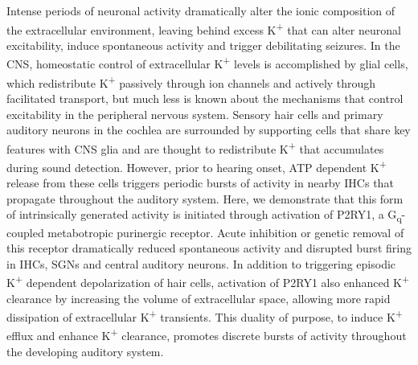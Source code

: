 \documentclass[9pt,lineno]{elife}
\begin{document}
Intense periods of neuronal activity dramatically alter the ionic composition of the extracellular environment, leaving behind excess K\textsuperscript{+} that can alter neuronal excitability, induce spontaneous activity and trigger debilitating seizures. In the CNS, homeostatic control of extracellular K\textsuperscript{+} levels is accomplished by glial cells, which redistribute K\textsuperscript{+} passively through ion channels and actively through facilitated transport, but much less is known about the mechanisms that control excitability in the peripheral nervous system. Sensory hair cells and primary auditory neurons in the cochlea are surrounded by supporting cells that share key features with CNS glia and are thought to redistribute K\textsuperscript{+} that accumulates during sound detection. However, prior to hearing onset, ATP dependent K\textsuperscript{+} release from these cells triggers periodic bursts of activity in nearby IHCs that propagate throughout the auditory system. Here, we demonstrate that this form of intrinsically generated activity is initiated through activation of P2RY1, a G\textsubscript{q}-coupled metabotropic purinergic receptor. Acute inhibition or genetic removal of this receptor dramatically reduced spontaneous activity and disrupted burst firing in IHCs, SGNs and central auditory neurons. In addition to triggering episodic K\textsuperscript{+} dependent depolarization of hair cells, activation of P2RY1 also enhanced K\textsuperscript{+} clearance by increasing the volume of extracellular space, allowing more rapid dissipation of extracellular K\textsuperscript{+} transients. This duality of purpose, to induce K\textsuperscript{+} efflux and enhance K\textsuperscript{+} clearance, promotes discrete bursts of activity throughout the developing auditory system.
\end{document}
